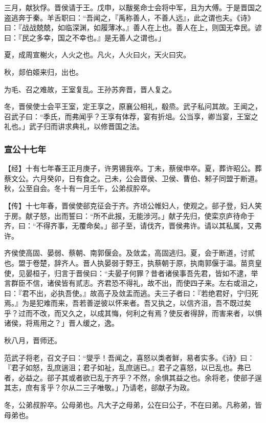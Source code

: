 \documentclass[]{article}
\begin{document}
三月，献狄俘。晋侯请于王。戊申，以黻冕命士会将中军，且为大傅。于是晋国之盗逃奔于秦。羊舌职曰：``吾闻之，『禹称善人，不善人远』，此之谓也夫。《诗》曰：『战战兢兢，如临深渊，如履薄冰。』善人在上也。善人在上，则国无幸民。谚曰：『民之多幸，国之不幸也。』是无善人之谓也。」

夏，成周宣榭火，人火之也。凡火，人火曰火，天火曰灾。

秋，郯伯姬来归，出也。

为毛、召之难故，王室复乱。王孙苏奔晋，晋人复之。

冬，晋侯使士会平王室，定王享之，原襄公相礼，殽烝。武子私问其故。王闻之，召武子曰：``季氏，而弗闻乎？王享有体荐，宴有折俎。公当享，卿当宴，王室之礼也。」武子归而讲求典礼，以修晋国之法。

\hypertarget{header-n1491}{%
\subsubsection{宣公十七年}\label{header-n1491}}

【经】十有七年春王正月庚子，许男锡我卒。丁未，蔡侯申卒。夏，葬许昭公。葬蔡文公。六月癸卯，日有食之。己未，公会晋侯、卫侯、曹伯、邾子同盟于断道。秋，公至自会。冬十有一月壬午，公弟叔肸卒。

【传】十七年春，晋侯使郤克征会于齐。齐顷公帷妇人，使观之。郤子登，妇人笑于房。献子怒，出而誓曰：``所不此报，无能涉河。」献子先归，使栾京庐待命于齐，曰：``不得齐事，无覆命矣。」郤子至，请伐齐，晋侯弗许。请以其私属，又弗许。

齐侯使高固、晏弱、蔡朝、南郭偃会。及敛孟，高固逃归。夏，会于断道，讨贰也。盟于卷楚，辞齐人。晋人执晏弱于野王，执蔡朝于原，执南郭偃于温。苗贲皇使，见晏桓子，归言于晋侯曰：``夫晏子何罪？昔者诸侯事吾先君，皆如不逮，举言群臣不信，诸侯皆有贰志。齐君恐不得礼，故不出，而使四子来。左右或沮之，曰：『君不出，必执吾使。』故高子及敛盂而逃。夫三子者曰：『若绝君好，宁归死焉。』为是犯难而来，吾若善逆彼以怀来者。吾又执之，以信齐沮，吾不既过矣乎？过而不改，而又久之，以成其悔，何利之有焉？使反者得辞，而害来者，以惧诸侯，将焉用之？」晋人缓之，逸。

秋八月，晋师还。

范武子将老，召文子曰：``燮乎！吾闻之，喜怒以类者鲜，易者实多。《诗》曰：『君子如怒，乱庶遄沮；君子如祉，乱庶遄已。』君子之喜怒，以已乱也。弗已者，必益之。郤子其或者欲已乱于齐乎？不然，余惧其益之也。余将老，使郤子逞其志，庶有豸乎？尔从二三子唯敬。」乃请老，郤献子为政。

冬，公弟叔肸卒。公母弟也。凡大子之母弟，公在曰公子，不在曰弟。凡称弟，皆母弟也。
\end{document}
